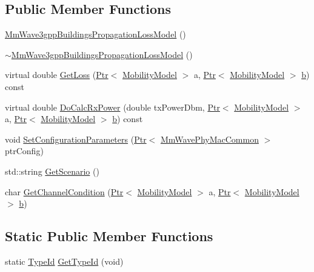 \subsection*{Public Member Functions}
\begin{DoxyCompactItemize}
\item 
\hyperlink{classns3_1_1MmWave3gppBuildingsPropagationLossModel_ad3912a9bdfdab7fd7d61db189152d201}{Mm\+Wave3gpp\+Buildings\+Propagation\+Loss\+Model} ()
\item 
\hyperlink{classns3_1_1MmWave3gppBuildingsPropagationLossModel_a1837bb06b6a3250c275f6be613c574aa}{$\sim$\+Mm\+Wave3gpp\+Buildings\+Propagation\+Loss\+Model} ()
\item 
virtual double \hyperlink{classns3_1_1MmWave3gppBuildingsPropagationLossModel_ae461e2a33b54da63fe384804e719813b}{Get\+Loss} (\hyperlink{classns3_1_1Ptr}{Ptr}$<$ \hyperlink{classns3_1_1MobilityModel}{Mobility\+Model} $>$ a, \hyperlink{classns3_1_1Ptr}{Ptr}$<$ \hyperlink{classns3_1_1MobilityModel}{Mobility\+Model} $>$ \hyperlink{lte__pathloss_8m_a21ad0bd836b90d08f4cf640b4c298e7c}{b}) const 
\item 
virtual double \hyperlink{classns3_1_1MmWave3gppBuildingsPropagationLossModel_ada18d8a51aff691ae918be09794df267}{Do\+Calc\+Rx\+Power} (double tx\+Power\+Dbm, \hyperlink{classns3_1_1Ptr}{Ptr}$<$ \hyperlink{classns3_1_1MobilityModel}{Mobility\+Model} $>$ a, \hyperlink{classns3_1_1Ptr}{Ptr}$<$ \hyperlink{classns3_1_1MobilityModel}{Mobility\+Model} $>$ \hyperlink{lte__pathloss_8m_a21ad0bd836b90d08f4cf640b4c298e7c}{b}) const 
\item 
void \hyperlink{classns3_1_1MmWave3gppBuildingsPropagationLossModel_abc04a6608fb6867f56d2c0bc8819894d}{Set\+Configuration\+Parameters} (\hyperlink{classns3_1_1Ptr}{Ptr}$<$ \hyperlink{classns3_1_1MmWavePhyMacCommon}{Mm\+Wave\+Phy\+Mac\+Common} $>$ ptr\+Config)
\item 
std\+::string \hyperlink{classns3_1_1MmWave3gppBuildingsPropagationLossModel_a34191684441777c424a5e80ffd66782e}{Get\+Scenario} ()
\item 
char \hyperlink{classns3_1_1MmWave3gppBuildingsPropagationLossModel_a253410913bfffba44becf40d4b032201}{Get\+Channel\+Condition} (\hyperlink{classns3_1_1Ptr}{Ptr}$<$ \hyperlink{classns3_1_1MobilityModel}{Mobility\+Model} $>$ a, \hyperlink{classns3_1_1Ptr}{Ptr}$<$ \hyperlink{classns3_1_1MobilityModel}{Mobility\+Model} $>$ \hyperlink{lte__pathloss_8m_a21ad0bd836b90d08f4cf640b4c298e7c}{b})
\end{DoxyCompactItemize}
\subsection*{Static Public Member Functions}
\begin{DoxyCompactItemize}
\item 
static \hyperlink{classns3_1_1TypeId}{Type\+Id} \hyperlink{classns3_1_1MmWave3gppBuildingsPropagationLossModel_aed2de64e2d10a145b77ec70d26ee005e}{Get\+Type\+Id} (void)
\end{DoxyCompactItemize}
